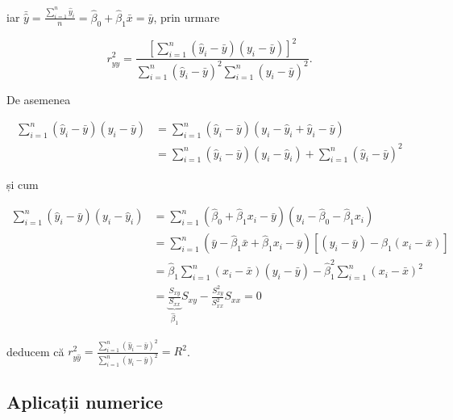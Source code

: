 \documentclass[]{article}
\begin{document}
iar
\(\bar{\hat y} = \frac{\sum_{i = 1}^{n}\hat y_i}{n} = \hat \beta_0 + \hat\beta_1 \bar x = \bar y\),
prin urmare

\[
r_{y\hat y}^2 = \frac{\left[\sum_{i = 1}^{n}(\hat y_i - \bar{y})(y_i - \bar y)\right]^2}{\sum_{i = 1}^{n}(\hat y_i - \bar{y})^2\sum_{i = 1}^{n}(y_i - \bar y)^2}.
\]

De asemenea

\begin{align*}
\sum_{i = 1}^{n}(\hat y_i - \bar{y})(y_i - \bar y) &= \sum_{i = 1}^{n}(\hat y_i - \bar{y})(y_i - \hat y_i + \hat y_i - \bar y) \\
 &= \sum_{i = 1}^{n}(\hat y_i - \bar{y})(y_i - \hat y_i) + \sum_{i = 1}^{n}(\hat y_i - \bar{y})^2
\end{align*}

și cum

\begin{align*}
\sum_{i = 1}^{n}(\hat y_i - \bar{y})(y_i - \hat y_i) &= \sum_{i = 1}^{n}(\hat \beta_0 + \hat\beta_1 x_i - \bar{y})(y_i - \hat \beta_0 - \hat\beta_1 x_i) \\
  &= \sum_{i = 1}^{n}(\bar y - \hat\beta_1 \bar x + \hat\beta_1 x_i - \bar{y})[(y_i - \bar y ) - \hat\beta_1 (x_i - \bar x)]\\
  &= \hat\beta_1 \sum_{i = 1}^{n}(x_i - \bar x)(y_i - \bar y) - \hat\beta_1^2 \sum_{i = 1}^{n}(x_i - \bar x)^2 \\
  &= \underbrace{\frac{S_{xy}}{S_{xx}}}_{\hat\beta_1}S_{xy} - \frac{S_{xy}^2}{S_{xx}^2}S_{xx} = 0
\end{align*}

deducem că
\(r_{y\hat y}^2 = \frac{\sum_{i = 1}^{n}(\hat y_i - \bar{y})^2}{\sum_{i = 1}^{n}(y_i - \bar y)^2} = R^2\).

\subsection{Aplicații numerice}\label{aplicatii-numerice}
\end{document}
